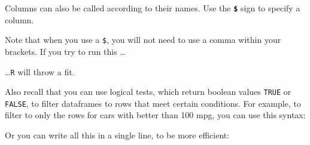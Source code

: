 \documentclass[]{book}
\newenvironment{Shaded}{\begin{snugshade}}{\end{snugshade}}
\newcommand{\CommentTok}[1]{\textcolor[rgb]{0.56,0.35,0.01}{\textit{#1}}}
\newcommand{\ControlFlowTok}[1]{\textcolor[rgb]{0.13,0.29,0.53}{\textbf{#1}}}
\newcommand{\DecValTok}[1]{\textcolor[rgb]{0.00,0.00,0.81}{#1}}
\newcommand{\KeywordTok}[1]{\textcolor[rgb]{0.13,0.29,0.53}{\textbf{#1}}}
\newcommand{\NormalTok}[1]{#1}
\newcommand{\OperatorTok}[1]{\textcolor[rgb]{0.81,0.36,0.00}{\textbf{#1}}}
\newcommand{\StringTok}[1]{\textcolor[rgb]{0.31,0.60,0.02}{#1}}
\begin{document}
Columns can also be called according to their names. Use the \textbf{\texttt{\$}} sign to specify a column.

\begin{Shaded}
\end{Shaded}

Note that when you use a \texttt{\$}, you will not need to use a comma within your brackets. If you try to run this \ldots{}

\begin{Shaded}
\end{Shaded}

\ldots{}\texttt{R} will throw a fit.

Also recall that you can use logical tests, which return boolean values \texttt{TRUE} or \texttt{FALSE}, to filter dataframes to rows that meet certain conditions. For example, to filter to only the rows for cars with better than 100 mpg, you can use this syntax:

\begin{Shaded}
\end{Shaded}

Or you can write all this in a single line, to be more efficient:
\end{document}
